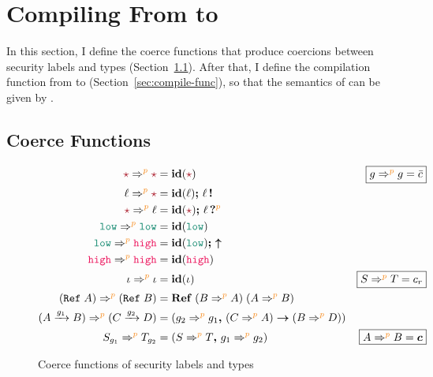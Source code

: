 \chapter{Compiling From \Surface to \CC}
\label{ch:compile}

{\color{NavyBlue} %

In this section, I define the coerce functions that produce coercions between
security labels and types (Section~\ref{sec:coerce-func}). After that, I define
the compilation function from \Surface to \CC (Section~\ref{sec:compile-func}),
so that the semantics of \Surface can be given by \CC.

} %

\section{Coerce Functions}
\label{sec:coerce-func}

\begin{figure}[tbp]
  \raggedright
  \begin{align*}
    \unk \Rightarrow^{\bl{p}} \unk &= \id{\unk} & \fbox{$g\Rightarrow^{\bl{p}}g=\bar{c}$} \\
    \ell \Rightarrow^{\bl{p}} \unk &= \id{\ell} \seq \inj{\ell} \\
    \unk \Rightarrow^{\bl{p}} \ell &= \id{\unk} \seq \proj{\ell}{\bl{p}} \\
    \low \Rightarrow^{\bl{p}} \low &= \id{\low} \\
    \low \Rightarrow^{\bl{p}} \high &= \id{\low} \seq \up \\
    \high \Rightarrow^{\bl{p}} \high &= \id{\high} \\
    \iota \Rightarrow^{\bl{p}} \iota &= \id{\iota} & \fbox{$S \Rightarrow^{\bl{p}} T = c_r$} \\
    (\Refer{A}) \Rightarrow^{\bl{p}} (\Refer{B}) &= \refco{(B \Rightarrow^{\bl{p}} A)}{(A \Rightarrow^{\bl{p}} B)} \\
    (\Fun{A}{g_1}{B}) \Rightarrow^{\bl{p}} (\Fun{C}{g_2}{D}) &= (\funco{g_2 \Rightarrow^{\bl{p}} g_1}{(C \Rightarrow^{\bl{p}} A)}{(B \Rightarrow^{\bl{p}} D)}) \\
    S_{g_1} \Rightarrow^{\bl{p}} T_{g_2} &= (\coerc{S \Rightarrow^{\bl{p}} T}{g_1 \Rightarrow^{\bl{p}} g_2}) & \fbox{$A \Rightarrow^{\bl{p}} B = \bm{c}$}
  \end{align*}
  \caption{Coerce functions of security labels and types}
  \label{fig:coerce}
\end{figure}

